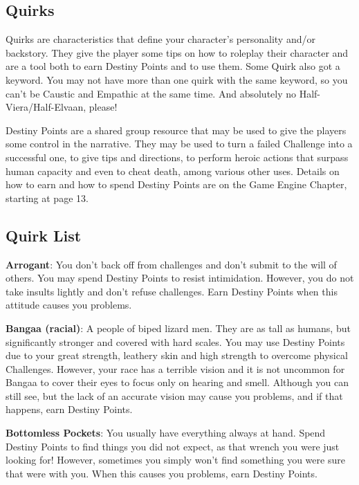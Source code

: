 \begin{multicols}{2}
\section{Quirks}
Quirks are characteristics that define your
character's personality and/or backstory. They
give the player some tips on how to roleplay their
character and are a tool both to earn Destiny
Points and to use them. Some Quirk also got a
keyword. You may not have more than one quirk
with the same keyword, so you can't be Caustic
and Empathic at the same time. And absolutely no
Half-Viera/Half-Elvaan, please!

Destiny Points are a shared group resource
that may be used to give the players some control
in the narrative. They may be used to turn a failed
Challenge into a successful one, to give tips and
directions, to perform heroic actions that surpass
human capacity and even to cheat death, among
various other uses. Details on how to earn and how
to spend Destiny Points are on the Game Engine
Chapter, starting at page 13.

\subsection{Quirk List}

\textbf{Arrogant}: You don’t back off from
challenges and don’t submit to the will of others.
You may spend Destiny Points to resist
intimidation. However, you do not take insults
lightly and don’t refuse challenges. Earn Destiny
Points when this attitude causes you problems.

\textbf{Bangaa (racial)}: A people of biped
lizard men. They are as tall as humans,
but significantly stronger and
covered with hard scales. You may use
Destiny Points due to your great strength,
leathery skin and high strength to overcome physical
Challenges.
However, your race has a terrible vision and it is
not uncommon for Bangaa to cover their eyes to
focus only on hearing and smell. Although you can
still see, but the lack of an accurate vision may
cause you problems, and if that happens, earn
Destiny Points.

\textbf{Bottomless Pockets}: You usually have
everything always at hand. Spend Destiny Points to
find things you did not expect, as that wrench you
were just looking for! However, sometimes you
simply won’t find something you were sure that
were with you. When this causes you problems,
earn Destiny Points.


\end{multicols}
